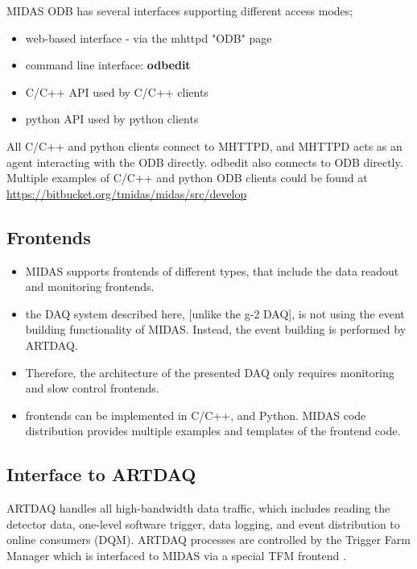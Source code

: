 MIDAS ODB has several interfaces supporting different access modes;
\begin{itemize}
\item 
  web-based interface - via the mhttpd "ODB" page
\item
  command line interface: {\bf odbedit}
\item
  C/C++ API used by C/C++ clients
\item
  python API used by python clients
\end{itemize}

All C/C++ and python clients connect to MHTTPD, and MHTTPD acts as an agent
interacting with the ODB directly.
%
odbedit also connects to ODB directly.
%
Multiple examples of C/C++ and python ODB clients could be found at
{\blue \href{https://bitbucket.org/tmidas/midas/src/develop/}{https://bitbucket.org/tmidas/midas/src/develop}}

\subsection{Frontends}

\begin{itemize}
\item 
  MIDAS supports frontends of different types, that include the data readout and monitoring
  frontends.
\item 
  the DAQ system described here, [unlike the g-2 DAQ], is not using the event building
  functionality of MIDAS. Instead, the event building is performed by ARTDAQ.
\item 
  Therefore, the architecture of the presented DAQ only requires monitoring
  and slow control frontends.
\item
  frontends can be implemented in C/C++, and Python. MIDAS code distribution
  provides multiple examples and templates of the frontend code.
\end{itemize}


\subsection{Interface to ARTDAQ}
ARTDAQ handles all high-bandwidth data traffic, which includes reading the
detector data, one-level software trigger, data logging, and event distribution
to online consumers (DQM).
%
ARTDAQ processes are controlled by the Trigger Farm Manager \cite{DAQ_2025_TFM}
which is interfaced to MIDAS via a special TFM frontend \cite{DAQ_2025_FRONTENDS}.

